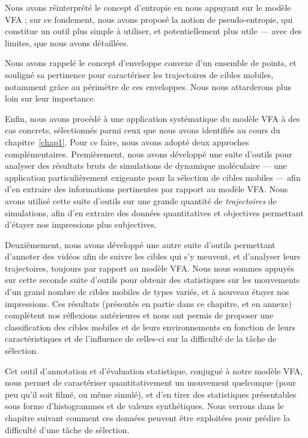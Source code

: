 	Nous avons réinterprété le concept d'entropie en nous appuyant sur le modèle VFA ; sur ce fondement, nous avons proposé la notion de pseudo-entropie, qui constitue un outil plus simple à utiliser, et potentiellement plus utile --- avec des limites, que nous avons détaillées.	
	
	Nous avons rappelé le concept d'enveloppe convexe d'un ensemble de points, et souligné sa pertinence pour caractériser les trajectoires de cibles mobiles, notamment grâce au périmètre de ces enveloppes. Nous nous attarderons plus loin sur leur importance.
	
	Enfin, nous avons procédé à une application systématique du modèle VFA à des cas concrets, sélectionnés parmi ceux que nous avons identifiés au cours du chapitre~\ref{chap1}. Pour ce faire, nous avons adopté deux approches complémentaires. Premièrement, nous avons développé une suite d'outils pour analyser des résultats bruts de simulations de dynamique moléculaire --- une application particulièrement exigeante pour la sélection de cibles mobiles --- afin d'en extraire des informations pertinentes par rapport au modèle VFA. Nous avons utilisé cette suite d'outils sur une grande quantité de \emph{trajectoires} de simulations, afin d'en extraire des données quantitatives et objectives permettant d'étayer nos impressions plus subjectives.
	
	Deuxièmement, nous avons développé une autre suite d'outils permettant d'annoter des vidéos afin de suivre les cibles qui s'y meuvent, et d'analyser leurs trajectoires, toujours par rapport au modèle VFA. Nous nous sommes appuyés sur cette seconde suite d'outils pour obtenir des statistiques sur les mouvements d'un grand nombre de cibles mobiles de types variés, et à nouveau étayer nos impressions. Ces résultats (présentés en partie dans ce chapitre, et en annexe) complètent nos réflexions antérieures et nous ont permis de proposer une classification des cibles mobiles et de leurs environnements en fonction de leurs caractéristiques et de l'influence de celles-ci sur la difficulté de la tâche de sélection.
	
	Cet outil d'annotation et d'évaluation statistique, conjugué à notre modèle VFA, nous permet de caractériser quantitativement un mouvement quelconque (pour peu qu'il soit filmé, ou même simulé), et d'en tirer des statistiques présentables sous forme d'histogrammes et de valeurs synthétiques. Nous verrons dans le chapitre suivant comment ces données peuvent être exploitées pour prédire la difficulté d'une tâche de sélection.

\clearpage
